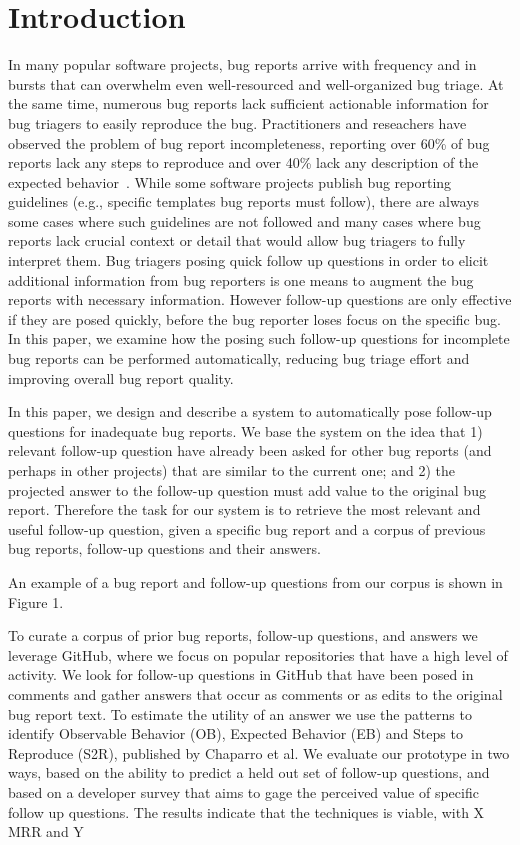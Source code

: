 \section{Introduction}

In many popular software projects, bug reports arrive with frequency and in bursts that can overwhelm even well-resourced and well-organized bug triage. At the same time, numerous bug reports lack sufficient actionable information for bug triagers to easily reproduce the bug. Practitioners and reseachers have observed the problem of bug report incompleteness, reporting over 60\% of bug reports lack any steps to reproduce and over 40\% lack any description of the expected behavior~\cite{chaparro17detecting}. While some software projects publish bug reporting guidelines (e.g., specific templates bug reports must follow), there are always some cases where such guidelines are not followed and many cases where bug reports lack crucial context or detail that would allow bug triagers to fully interpret them. Bug triagers posing quick follow up questions in order to elicit additional information from bug reporters is one means to augment the bug reports with necessary information. However follow-up questions are only effective if they are posed quickly, before the bug reporter loses focus on the specific bug. In this paper, we examine how the posing such follow-up questions for incomplete bug reports can be performed automatically, reducing bug triage effort and improving overall bug report quality.

In this paper, we design and describe a system to automatically pose follow-up questions for inadequate bug reports. We base the system on the idea that 1) relevant follow-up question have already been asked for other bug reports (and perhaps in other projects) that are similar to the current one; and 2) the projected answer to the follow-up question must add value to the original bug report. Therefore the task for our system is to retrieve the most relevant and useful follow-up question, given a specific bug report and a corpus of previous bug reports, follow-up questions and their answers.

An example of a bug report and follow-up questions from our corpus is shown in Figure 1.


To curate a corpus of prior bug reports, follow-up questions, and answers we leverage GitHub, where we focus on popular repositories that have a high level of activity. We look for follow-up questions in GitHub that have been posed in comments and gather answers that occur as comments or as edits to the original bug report text. To estimate the utility of an answer we use the patterns to identify Observable Behavior (OB), Expected Behavior (EB) and Steps to Reproduce (S2R), published by Chaparro et al. We evaluate our prototype in two ways, based on the ability to predict a held out set of follow-up questions, and based on a developer survey that aims to gage the perceived value of specific follow up questions. The results indicate that the techniques is viable, with X MRR and Y%
